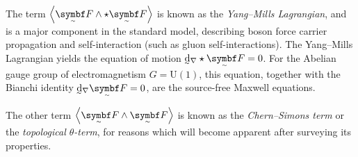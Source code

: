 The term $\angbr{\tsbm F \wedge\star \tsbm F}$ is known as the \emph{Yang--Mills Lagrangian}, and is a major component in the standard model, describing boson force carrier propagation and self-interaction (such as gluon self-interactions).
The Yang--Mills Lagrangian yields the equation of motion $\covdd\star\tsbm F = 0$.
For the Abelian gauge group of electromagnetism $G = \mathrm{U}(1)$, this equation, together with the Bianchi identity $\covdd\tsbm F = 0$, are the source-free Maxwell equations.


The other term $\angbr{\tsbm F \wedge \tsbm F}$ is known as the \emph{Chern--Simons term} or the \emph{topological $θ$-term}, for reasons which will become apparent after surveying its properties.
